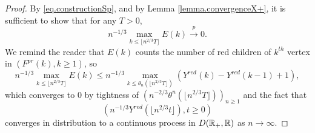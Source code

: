 \begin{proof}
By \eqref{eq.constructionSp}, and by Lemma \ref{lemma.convergenceX+}, it is sufficient to show that for any $T>0$,
$$n^{-1/3}\max_{k\leq \lfloor n^{2/3}T\rfloor}E(k)\overset{p}{\to}0.$$
We remind the reader that $E(k)$ counts the number of red children of $k^{th}$ vertex in $(F^{pr}(k),k\geq 1)$, so
$$n^{-1/3}\max_{k\leq \lfloor n^{2/3}T\rfloor}E(k)\leq n^{-1/3}\max_{k\leq \theta_n(\lfloor n^{2/3}T\rfloor)}(Y^{red}(k)-Y^{red}(k-1)+1),$$
which converges to $0$ by tightness of $\left(n^{-2/3}\theta^{n}(\lfloor n^{2/3}T\rfloor)\right)_{n\geq 1}$ and the fact that $$\left(n^{-1/3}Y^{red}\left(\lfloor n^{2/3}t\rfloor\right),t\geq 0\right)$$ converges in distribution to a continuous process in $D({\mathbb R}_+,{\mathbb R})$ as $n\to\infty$.
\end{proof}

